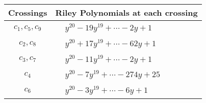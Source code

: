 \documentclass[1p]{elsarticle_modified}
\theoremstyle{definition}
\begin{document}
\begin{tabular}{m{50pt}|m{274pt}}
Crossings & \hspace{64pt}Riley Polynomials at each crossing \\
\hline $$\begin{aligned}c_{1},c_{5},c_{9}\end{aligned}$$&$\begin{aligned}
&y^{20}-19 y^{19}+\cdots-2 y+1
\end{aligned}$\\
\hline $$\begin{aligned}c_{2},c_{8}\end{aligned}$$&$\begin{aligned}
&y^{20}+17 y^{19}+\cdots-62 y+1
\end{aligned}$\\
\hline $$\begin{aligned}c_{3},c_{7}\end{aligned}$$&$\begin{aligned}
&y^{20}-11 y^{19}+\cdots-2 y+1
\end{aligned}$\\
\hline $$\begin{aligned}c_{4}\end{aligned}$$&$\begin{aligned}
&y^{20}-7 y^{19}+\cdots-274 y+25
\end{aligned}$\\
\hline $$\begin{aligned}c_{6}\end{aligned}$$&$\begin{aligned}
&y^{20}-3 y^{19}+\cdots-6 y+1
\end{aligned}$\\
\hline
\end{tabular}
\vskip 2pc
\end{document}
